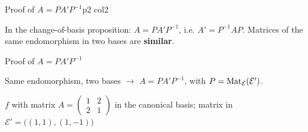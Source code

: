 \documentclass[course,noautoquant,noautokw]{neyvia-study}
\begin{document}
\begin{concept}[1.57]{Proof of $A=PA'P^{-1}$}{p2 col2}
\begin{definition}
\noindent In the change-of-basis proposition: $A=PA'P^{-1}$, i.e. $A'=P^{-1}AP$. Matrices of the same endomorphism in two bases are \textbf{similar}.
\end{definition}
\begin{method}{Proof of $A=PA'P^{-1}$}
\end{method}
\begin{reflex}
Same endomorphism, two bases \ensuremath{\rightarrow} $A=PA'P^{-1}$, with $P=\operatorname{Mat}_{\mathcal E}(\mathcal E')$.
\end{reflex}
\begin{worked}{$f$ with matrix $A=\begin{pmatrix}1&2\\2&1\end{pmatrix}$ in the canonical basis; matrix in $\mathcal E'=\big((1,1),(1,-1)\big)$}
\end{worked}
\begin{traps}

\end{traps}
\end{concept}
\end{document}
